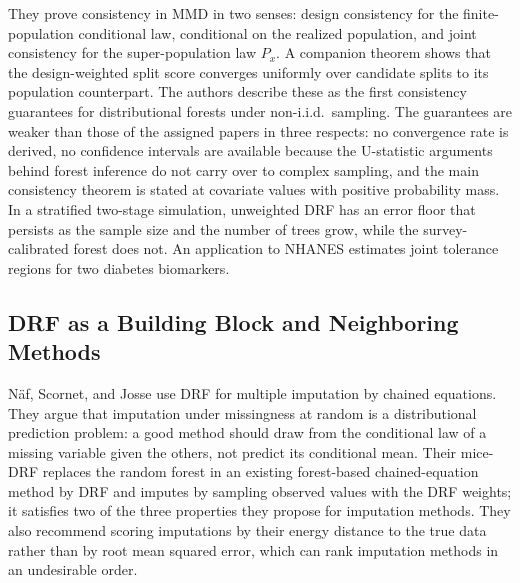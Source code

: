 \documentclass[12pt,a4paper]{article}
\newcommand{\1}{\mathbf 1}
\begin{document}
They prove consistency in MMD in two senses: design consistency for the finite-population conditional law, conditional on the realized population, and joint consistency for the super-population law $P_x$. A companion theorem shows that the design-weighted split score converges uniformly over candidate splits to its population counterpart. The authors describe these as the first consistency guarantees for distributional forests under non-i.i.d.\ sampling. The guarantees are weaker than those of the assigned papers in three respects: no convergence rate is derived, no confidence intervals are available because the U-statistic arguments behind forest inference do not carry over to complex sampling, and the main consistency theorem is stated at covariate values with positive probability mass. In a stratified two-stage simulation, unweighted DRF has an error floor that persists as the sample size and the number of trees grow, while the survey-calibrated forest does not. An application to NHANES estimates joint tolerance regions for two diabetes biomarkers.

\subsection{DRF as a Building Block and Neighboring Methods}\label{sec:applications}
N\"af, Scornet, and Josse \cite{naf2024imp} use DRF for multiple imputation by chained equations. They argue that imputation under missingness at random is a distributional prediction problem: a good method should draw from the conditional law of a missing variable given the others, not predict its conditional mean. Their mice-DRF replaces the random forest in an existing forest-based chained-equation method by DRF and imputes by sampling observed values with the DRF weights; it satisfies two of the three properties they propose for imputation methods. They also recommend scoring imputations by their energy distance to the true data rather than by root mean squared error, which can rank imputation methods in an undesirable order.
\end{document}
